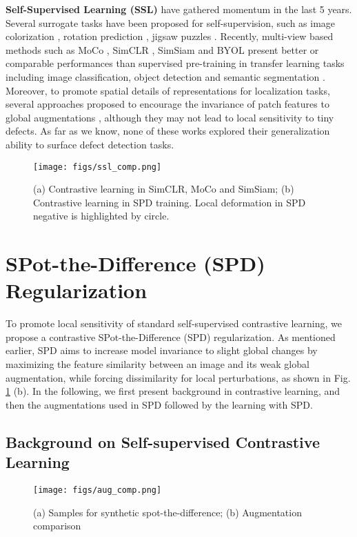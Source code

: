 \documentclass[runningheads]{llncs}
\begin{document}
\noindent\textbf{Self-Supervised Learning (SSL)} have gathered momentum in the last 5 years. Several surrogate tasks have been proposed for self-supervision, such as image colorization \cite{zhang2016colorful}, rotation prediction \cite{gidaris2018unsupervised}, jigsaw puzzles \cite{noroozi2016unsupervised}. Recently, multi-view based methods such as MoCo \cite{he2020momentum}, SimCLR \cite{chen2020simple}, SimSiam \cite{chen2021exploring} and BYOL \cite{grill2020bootstrap} present better or comparable performances than supervised pre-training in transfer learning tasks including image classification, object detection \cite{Yang_2021_CVPR} and semantic segmentation \cite{wang2021dense}. Moreover, to promote spatial details of representations for localization tasks, several approaches proposed to encourage the invariance of patch features to global augmentations \cite{wang2021dense,xie2021detco,liu2020self,chen2021multisiam}, although they may not lead to local sensitivity to tiny defects. As far as we know, none of these works explored their generalization ability to surface defect detection tasks. 

\begin{figure}[!t]
 \centering
\texttt{[image: figs/ssl\_comp.png]}
\caption{(a) Contrastive learning in SimCLR, MoCo and SimSiam; (b) Contrastive learning in SPD training. Local deformation in SPD negative is highlighted by circle.}
\label{fig:ssl_comp}
\end{figure}

\section{SPot-the-Difference (SPD) Regularization}
To promote local sensitivity of standard self-supervised contrastive learning, we propose a contrastive SPot-the-Difference (SPD) regularization. As mentioned earlier, SPD aims to increase model invariance to slight global changes by maximizing the feature similarity between an image and its weak global augmentation, while forcing dissimilarity for local perturbations, as shown in Fig. \ref{fig:ssl_comp} (b). In the following, we first present background in contrastive learning, and then the augmentations used in SPD followed by the learning with SPD.
\subsection{Background on Self-supervised Contrastive Learning}
\begin{figure}[!t]
\centering
\texttt{[image: figs/aug\_comp.png]}
\caption{(a) Samples for synthetic spot-the-difference; (b) Augmentation comparison}
\label{fig:aug_compare}
\end{figure}
\end{document}
